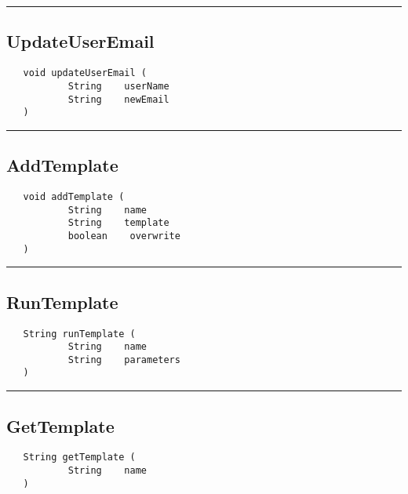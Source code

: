 \rule{15cm}{2pt}
\subsection{UpdateUserEmail}
\label{Api:UpdateUserEmail}
\begin{verbatim}
   void updateUserEmail (
           String    userName
           String    newEmail
   )
\end{verbatim}



\rule{15cm}{2pt}
\subsection{AddTemplate}
\label{Api:AddTemplate}
\begin{verbatim}
   void addTemplate (
           String    name
           String    template
           boolean    overwrite
   )
\end{verbatim}



\rule{15cm}{2pt}
\subsection{RunTemplate}
\label{Api:RunTemplate}
\begin{verbatim}
   String runTemplate (
           String    name
           String    parameters
   )
\end{verbatim}



\rule{15cm}{2pt}
\subsection{GetTemplate}
\label{Api:GetTemplate}
\begin{verbatim}
   String getTemplate (
           String    name
   )
\end{verbatim}



